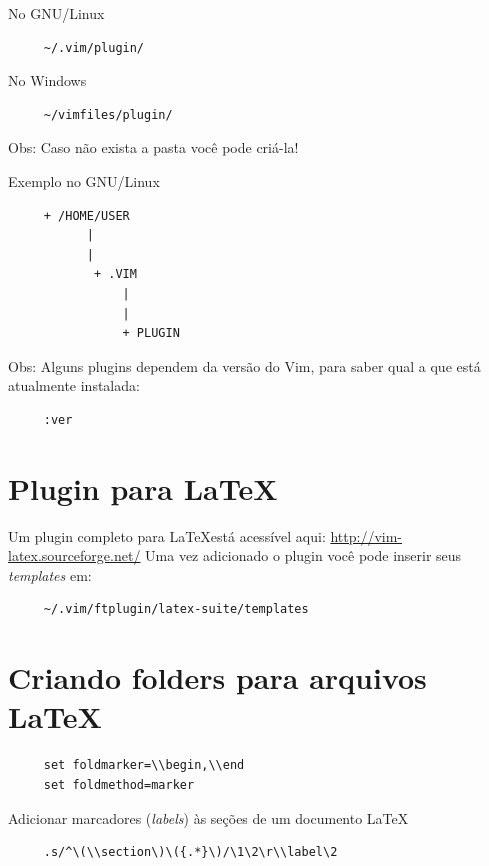 \documentclass[10pt,a4paper,openany]{book}
\begin{document}
No GNU/Linux
\begin{verbatim}
     ~/.vim/plugin/
\end{verbatim}

No Windows

\begin{verbatim}
     ~/vimfiles/plugin/
\end{verbatim}

Obs: Caso não exista a pasta você pode criá-la!

Exemplo no GNU/Linux

\begin{verbatim}
     + /HOME/USER
           |
           |
            + .VIM
                |
                |
                + PLUGIN
\end{verbatim}

Obs: Alguns plugins dependem da versão do Vim, para saber qual
a que está atualmente instalada:

\begin{verbatim}
     :ver
\end{verbatim}

\section{Plugin para \LaTeX}
\label{Plugin para LaTeX}
Um plugin completo para \LaTeX está acessível aqui: \url{http://vim-latex.sourceforge.net/}
Uma vez adicionado o plugin você pode inserir seus {\em templates}
em:

\begin{verbatim}
     ~/.vim/ftplugin/latex-suite/templates
\end{verbatim}


\section{Criando folders para arquivos \LaTeX}
\label{Criando folders para arquivos LaTeX}

\begin{verbatim}
     set foldmarker=\\begin,\\end
     set foldmethod=marker
\end{verbatim}

Adicionar marcadores ({\em labels}) às seções de um documento \LaTeX
\begin{verbatim}
     .s/^\(\\section\)\({.*}\)/\1\2\r\\label\2
\end{verbatim}
\end{document}
